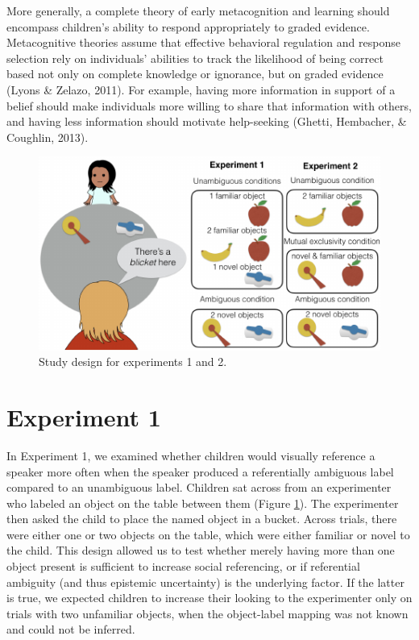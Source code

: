 \documentclass[english,man]{apa6}
\theoremstyle{definition}
\theoremstyle{definition}
\theoremstyle{definition}
\theoremstyle{remark}
\begin{document}
More generally, a complete theory of early metacognition and learning
should encompass children's ability to respond appropriately to graded
evidence. Metacognitive theories assume that effective behavioral
regulation and response selection rely on individuals' abilities to
track the likelihood of being correct based not only on complete
knowledge or ignorance, but on graded evidence (Lyons \& Zelazo, 2011).
For example, having more information in support of a belief should make
individuals more willing to share that information with others, and
having less information should motivate help-seeking (Ghetti, Hembacher,
\& Coughlin, 2013).

\begin{figure}[htbp]
\centering
\includegraphics{figs/design-1.pdf}
\caption{\label{fig:design}Study design for experiments 1 and 2.}
\end{figure}

\section{Experiment 1}\label{experiment-1}

In Experiment 1, we examined whether children would visually reference a
speaker more often when the speaker produced a referentially ambiguous
label compared to an unambiguous label. Children sat across from an
experimenter who labeled an object on the table between them (Figure
\ref{fig:design}). The experimenter then asked the child to place the
named object in a bucket. Across trials, there were either one or two
objects on the table, which were either familiar or novel to the child.
This design allowed us to test whether merely having more than one
object present is sufficient to increase social referencing, or if
referential ambiguity (and thus epistemic uncertainty) is the underlying
factor. If the latter is true, we expected children to increase their
looking to the experimenter only on trials with two unfamiliar objects,
when the object-label mapping was not known and could not be inferred.
\end{document}
